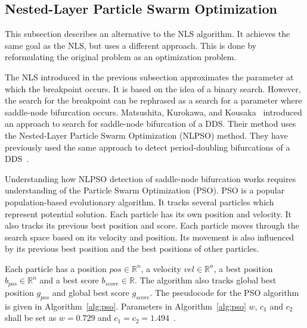 \subsection{Nested-Layer Particle Swarm Optimization}
This subsection describes an alternative to the NLS algorithm.
It achieves the same goal as the NLS, but uses a different approach.
This is done by reformulating the original problem as an optimization problem.
\par
The NLS introduced in the previous subsection approximates the parameter at which the breakpoint occurs.
It is based on the idea of a binary search.
However, the search for the breakpoint can be rephrased as a search for a parameter where saddle-node bifurcation occurs.
Matsushita, Kurokawa, and Kousaka~\cite{Matsushita2019} introduced an approach to search for saddle-node bifurcation of a DDS.
Their method uses the Nested-Layer Particle Swarm Optimization (NLPSO) method.
They have previously used the same approach to detect period-doubling bifurcations of a DDS~\cite{Matsushita20170721}.
\par
Understanding how NLPSO detection of saddle-node bifurcation works requires understanding of the Particle Swarm Optimization (PSO).
PSO is a popular population-based evolutionary algorithm.
It tracks several particles which represent potential solution.
Each particle has its own position and velocity. It also tracks its previous best position and score.
Each particle moves through the search space based on its velocity and position.
Its movement is also influenced by its previous best position and the best positions of other particles.~\cite{Matsushita2019}
\par
Each particle has a position $pos \in \mathbb{R}^{n}$, a velocity $vel \in \mathbb{R}^{n}$, a best position $b_{pos} \in \mathbb{R}^{n}$ and a best score $b_{score} \in \mathbb{R}$.
The algorithm also tracks global best position $g_{pos}$ and global best score $g_{score}$.
The pseudocode for the PSO algorithm is given in Algorithm~\ref{alg:pso}.
Parameters in Algorithm~\ref{alg:pso} $w$, $c_{1}$ and $c_{2}$ shall be set as $w=0.729$ and $c_{1}=c_{2}=1.494$~\cite{Matsushita2019}.

